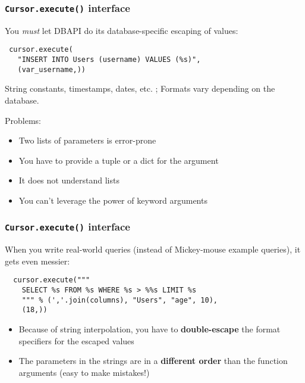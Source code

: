 \documentclass{beamer}
\begin{document}
\begin{frame}[fragile]
  \frametitle{\texttt{Cursor.execute()} interface}

  You \emph{must} let DBAPI do its database-specific escaping of values:
\begin{verbatim}
 cursor.execute(
   "INSERT INTO Users (username) VALUES (%s)",
   (var_username,))
\end{verbatim}

String constants, timestamps, dates, etc. ; Formats vary depending on the
database.

\pause
\vfill
Problems:
\begin{itemize}
\item Two lists of parameters is error-prone
\item You have to provide a tuple or a dict for the argument
\item It does not understand lists 
\item You can't leverage the power of keyword arguments
\end{itemize}

\end{frame}


\begin{frame}[fragile]
  \frametitle{\texttt{Cursor.execute()} interface}

  When you write real-world queries (instead of Mickey-mouse example
  queries), it gets even messier:
\begin{verbatim}
  cursor.execute("""
    SELECT %s FROM %s WHERE %s > %%s LIMIT %s
    """ % (','.join(columns), "Users", "age", 10),
    (18,))
\end{verbatim}

\begin{itemize}
\item Because of string interpolation, you have to \textbf{double-escape} the
  format specifiers for the escaped values
\item The parameters in the strings are in a \textbf{different order} than the
  function arguments (easy to make mistakes!)
\end{itemize}

\end{frame}
\end{document}
